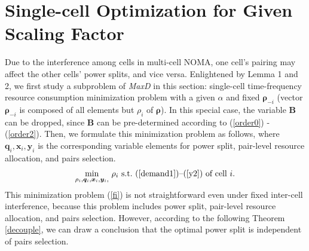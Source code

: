 \documentclass[10pt,journal,final,finalsubmission,twocolumn]{IEEEtran}
\begin{document}
\section{Single-cell Optimization for Given Scaling Factor}\label{CellLoadsMinimization}

Due to the interference among cells in multi-cell NOMA, one cell's pairing may affect the other cells' power splits, and vice versa. Enlightened by Lemma 1 and 2, we first study a subproblem of {\em MaxD} in this section: single-cell time-frequency resource consumption minimization problem with a given $\alpha$ and fixed $\boldsymbol{\rho}_{-i}$ (vector $\boldsymbol{\rho}_{-i}$ is composed of all elements but $\rho_i$ of $\boldsymbol{\rho}$). In this special case, the variable $\boldsymbol{B}$ can be dropped, since $\boldsymbol{B}$ can be pre-determined according to (\ref{order0}) - (\ref{order2}). Then, we formulate this minimization problem as follows, where $\boldsymbol{q}_i,\boldsymbol{x}_i,\boldsymbol{y}_i$ is the corresponding variable elements for power split, pair-level resource allocation, and pairs selection.
\begin{equation}\label{fi}
 \underset{\rho_i, \boldsymbol{q}_i,\boldsymbol{x}_i,\boldsymbol{y}_i,}{\min} \  \rho_i \ \textup{s.t.\ (\ref{demand1})--(\ref{y2}) of cell $i$} .
\end{equation}
This minimization problem (\ref{fi}) is not straightforward even under fixed inter-cell interference, because this problem includes power split,  pair-level resource allocation, and pairs selection. However, according to the following Theorem \ref{decouple}, we can draw a conclusion that the optimal power split is independent of pairs selection.
\end{document}
